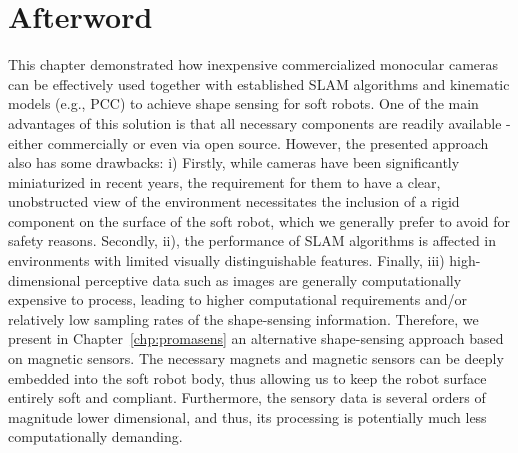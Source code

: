 \newpage







\section*{Afterword}
This chapter demonstrated how inexpensive commercialized monocular cameras can be effectively used together with established \gls{SLAM} algorithms and kinematic models (e.g., \gls{PCC}) to achieve shape sensing for soft robots. One of the main advantages of this solution is that all necessary components are readily available - either commercially or even via open source. However, the presented approach also has some drawbacks: 
i) Firstly, while cameras have been significantly miniaturized in recent years, the requirement for them to have a clear, unobstructed view of the environment necessitates the inclusion of a rigid component on the surface of the soft robot, which we generally prefer to avoid for safety reasons. 
Secondly, ii), the performance of \gls{SLAM} algorithms is affected in environments with limited visually distinguishable features.
Finally, iii) high-dimensional perceptive data such as images are generally computationally expensive to process, leading to higher computational requirements and/or relatively low sampling rates of the shape-sensing information.
Therefore, we present in Chapter~\ref{chp:promasens} an alternative shape-sensing approach based on magnetic sensors. The necessary magnets and magnetic sensors can be deeply embedded into the soft robot body, thus allowing us to keep the robot surface entirely soft and compliant. Furthermore, the sensory data is several orders of magnitude lower dimensional, and thus, its processing is potentially much less computationally demanding.